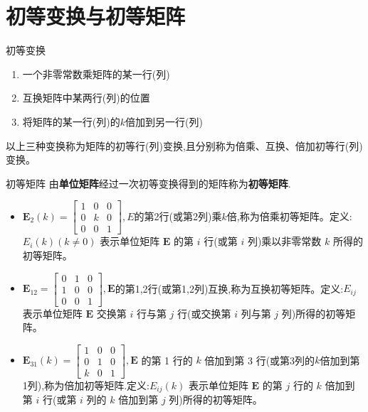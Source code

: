 \documentclass[8pt a4paper,oneside,UTF8]{ctexbook}
\begin{document}
\begin{sloppypar}
    \section{初等变换与初等矩阵}
    \begin{defn}{初等变换}{}
        \begin{enumerate}
            \item 一个非零常数乘矩阵的某一行(列)
            \item 互换矩阵中某两行(列)的位置
            \item 将矩阵的某一行(列)的$k$倍加到另一行(列)
        \end{enumerate}
        以上三种变换称为矩阵的初等行(列)变换,且分别称为倍乘、互换、倍加初等行(列)变换。
    \end{defn}
    \begin{defn}{初等矩阵}{}
        由\textbf{单位矩阵}经过一次初等变换得到的矩阵称为\textbf{初等矩阵}.
        \begin{itemize}
            \item  $\boldsymbol{E}_2(k)=\left[\begin{array}{lll}1 & 0 & 0 \\ 0 & k & 0 \\ 0 & 0 & 1\end{array}\right],E$的第2行(或第2列)乘$k$倍,称为倍乘初等矩阵。定义:$E_i(k)(k \neq 0)$ 表示单位矩阵 $\boldsymbol{E}$ 的第 $i$ 行(或第 $i$ 列)乘以非零常数 $k$ 所得的初等矩阵。
            \item $\boldsymbol{E}_{12}=\left[\begin{array}{lll}0 & 1 & 0 \\ 1 & 0 & 0 \\ 0 & 0 & 1\end{array}\right],\boldsymbol{E}$的第1,2行(或第1,2列)互换,称为互换初等矩阵。定义:$E_{i j}$ 表示单位矩阵 $\boldsymbol{E}$ 交换第 $i$ 行与第 $j$ 行(或交换第 $i$ 列与第 $j$ 列)所得的初等矩阵。
            \item $\boldsymbol{E}_{31}(k)=\left[\begin{array}{lll}1 & 0 & 0 \\ 0 & 1 & 0 \\ k & 0 & 1\end{array}\right], \boldsymbol{E}$ 的第 1 行的 $k$ 倍加到第 3 行(或第3列的$k$倍加到第1列),称为倍加初等矩阵.定义:$E_{i j}(k)$ 表示单位矩阵 $\boldsymbol{E}$ 的第 $j$ 行的 $k$ 倍加到第 $i$ 行(或第 $i$ 列的 $k$ 倍加到第 $j$ 列)所得的初等矩阵。
        \end{itemize}
    \end{defn}

\end{sloppypar}
\end{document}
